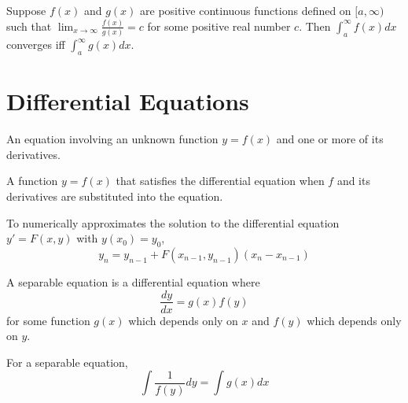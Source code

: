 \begin{theorem}
  Suppose $f(x)$ and $g(x)$ are positive continuous functions defined on $[a, \infty)$ such that $\displaystyle \lim_{x \to \infty} \frac{f(x)}{g(x)} = c$ for some positive real number $c$. Then $\int_a^\infty f(x) dx$ converges iff $\int_a^\infty g(x) dx$.
\end{theorem}

\section{Differential Equations}

\begin{definition} An equation involving an unknown function $y = f(x)$ and one or more of its derivatives.
\end{definition}

\begin{definition} A function $y = f(x)$ that satisfies the differential equation when $f$ and its derivatives are substituted into the equation.
\end{definition}

  

\begin{procedure} To numerically approximates the solution to the differential equation $y' = F(x, y)$ with $y(x_0) = y_0$,
  \[
    y_n = y_{n - 1} + F(x_{n-1}, y_{n - 1})(x_n - x_{n - 1})
  \]
\end{procedure}

\begin{definition} A separable equation is a differential equation where
  \[
    \frac{dy}{dx} = g(x)f(y)
  \]
  for some function $g(x)$ which depends only on $x$ and $f(y)$ which depends only on $y$.
\end{definition}

\begin{theorem} For a separable equation,
  \[
    \int \frac{1}{f(y)} dy = \int g(x) dx
  \]
\end{theorem}

